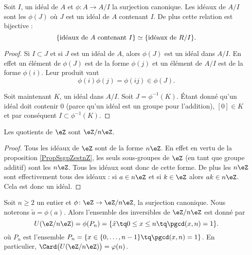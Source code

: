 \begin{proposition}     \label{PropIJJIdsousphi}
    Soit \( I\), un idéal de \( A\) et \( \phi\colon A\to A/I\) la surjection canonique. Les idéaux de \( A/I\) sont les \( \phi(J)\) où \( J\) est un idéal de \( A\) contenant \( I\). De plus cette relation est bijective :
    \begin{equation}        \label{EqKbrizu}
        \{ \text{idéaux de \( A\) contenant \( I\)}\}\simeq\{ \text{idéaux de \( R/I\)} \}.
    \end{equation}
\end{proposition}

\begin{proof}
    Si \( I\subset J\) et si \( J \) est un idéal de \( A\), alors \( \phi(J)\) est un idéal dans \( A/I\). En effet un élément de \( \phi(J)\) est de la forme \( \phi(j)\) et un élément de \( A/I\) est de la forme \( \phi(i)\). Leur produit vaut
    \begin{equation}
        \phi(i)\phi(j)=\phi(ij)\in\phi(J).
    \end{equation}
    
    Soit maintenant \( K\), un idéal dans \( A/I\). Soit \( J=\phi^{-1}(K)\). Étant donné qu'un idéal doit contenir \( 0\) (parce qu'un idéal est un groupe pour l'addition), \( [0]\in K\) et par conséquent \( I\subset\phi^{-1}(K)\).
\end{proof}

\begin{corollary}
    Les quotients de \( \eZ\) sont \( \eZ/n\eZ\).
\end{corollary}

\begin{proof}
    Tous les idéaux de \( \eZ\) sont de la forme \( n\eZ\). En effet en vertu de la proposition \ref{PropSsgpZestnZ}, les seuls sous-groupes de \( \eZ\) (en tant que groupe additif) sont les \( n\eZ\). Tous les idéaux sont donc de cette forme. De plus les \( n\eZ\) sont effectivement tous des idéaux : si \( a\in n\eZ\) et si \( k\in \eZ\) alors \( ak\in n\eZ\). Cela est donc un idéal.
\end{proof}

\begin{proposition}     \label{PropZpintssiprempUzn}
    Soit \( n\geq 2\) un entier et \( \phi\colon \eZ\to \eZ/n\eZ\), la surjection canonique. Nous noterons \( \tilde a=\phi(a)\). Alors l'ensemble des inversibles de \( \eZ/n\eZ\) est donné par
    \begin{equation}
        U(\eZ/n\eZ)=\phi(P_n)=\{ \tilde x\tq 0\leq x\leq n\tq\pgcd(x,n)=1 \}.
    \end{equation}
    où \( P_n\) est l'ensemble $P_n=\{ x\in\{ 0,\ldots,n-1 \}\tq\pgcd(x,n)=1 \}$. En particulier, \( \Card\big( U(\eZ/n\eZ) \big)=\varphi(n)\).
\end{proposition}

